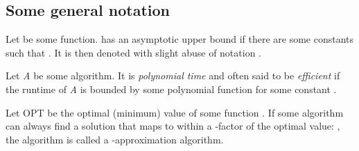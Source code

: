 \subsection{Some general notation}

\begin{definition}
	Let  be some function.   has an asymptotic upper bound  if there are some constants  such that . 
	It is then denoted with slight abuse of notation . 
\end{definition}

Let \emph{A} be some algorithm. 
It is \emph{polynomial time} and often said to be \emph{efficient} if the runtime of \emph{A} is bounded by some polynomial function  for some constant .

Let OPT be the optimal (minimum) value of some function . 
If some algorithm  can always find a solution that maps to within a \ilmath{\rho}-factor of the optimal value: , the algorithm is called a \ilmath{\rho}-approximation algorithm. 
